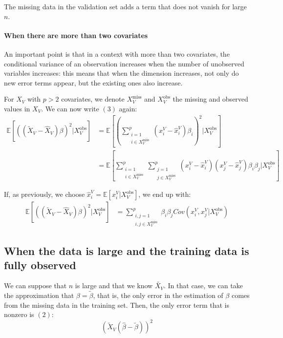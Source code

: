  The missing data in the validation set adds a term that does not vanish for large $n$.
 
 \paragraph*{When there are more than two covariates}
 An important point is that in a context with more than two covariates, the conditional variance of an observation increases when the number of unobserved variables increases: this means that when the dimension increases, not only do new error terms appear, but the existing ones also increase.
 
 For $X_V$ with $p>2$ covariates, we denote $X_V^{\text{miss}}$ and $X_V^{\text{obs}}$ the missing and observed values in $X_V$. We can now write $(3)$ again:
 \begin{align*}
 \mathbb{E}[((\tilde{X}_V - \hat{X}_V)\beta)^2 \vert X_V^{\text{obs}}] &= 
 		\mathbb{E}[ (\sum \limits_{\substack{i=1 \\i \in X_V^{\text{miss}}}}^{p} (x_i^V - \hat{x}_i^V)\beta_i)^2 \vert X_V^{\text{obs}}] \\
 		&= \mathbb{E}[\sum \limits_{\substack{i=1 \\i \in X_V^{\text{miss}}}}^{p} \sum \limits_{\substack{j=1 \\j \in X_V^{\text{miss}}}}^{p}
 			(x^V_i - \hat{x}^V_i)(x^V_j - \hat{x}^V_j)\beta_i \beta_j \vert X_V^{\text{obs}}]
 \end{align*}
 
 If, as previously, we choose $\hat{x}^V_i = \mathbb{E}[x^V_i \vert X_V^{\text{obs}}]$, we end up with:
 \begin{align*}
 \mathbb{E}[((\tilde{X}_V - \hat{X}_V)\beta)^2 \vert X_V^{\text{obs}}] &= 
 	\sum \limits_{\substack{i,j=1 \\i,j \in X_V^{\text{miss}}}}^{p} \beta_i \beta_j Cov(x^V_i, x^V_j \vert X_V^{\text{obs}})
 \end{align*}

		\subsection{When the data is large and the training data is fully observed}
We can suppose that $n$ is large and that we know $\tilde{X_V}$. In that case, we can take the approximation that $\beta = \tilde{\beta}$, that is, the only error in the estimation of $\beta$ comes from the missing data in the training set. Then, the only error term that is nonzero is $(2)$:
$$ (\tilde{X}_V (\hat{\beta} - \tilde{\beta}))^2$$

